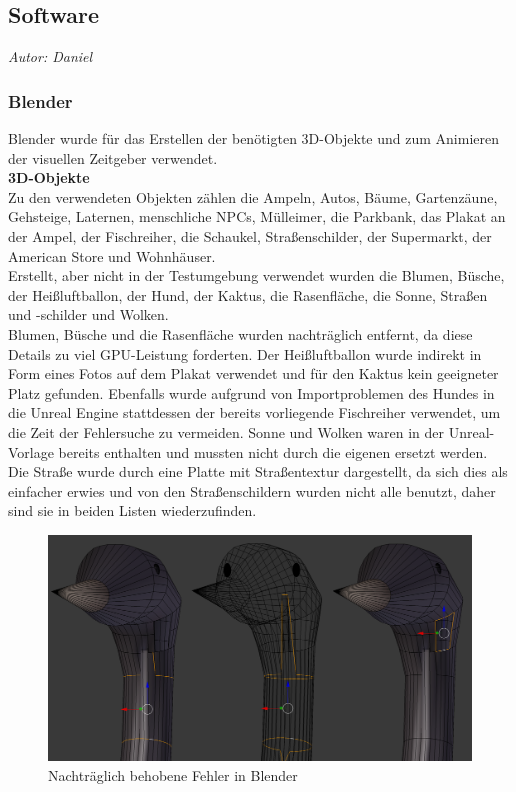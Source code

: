 \documentclass{Bericht}
\begin{document}
\subsection{Software}
\textit{Autor: Daniel}\\
\subsubsection{Blender}
Blender wurde für das Erstellen der benötigten 3D-Objekte und zum Animieren der visuellen Zeitgeber verwendet.\\

\textbf{3D-Objekte}\\
Zu den verwendeten Objekten zählen die Ampeln, Autos, Bäume, Gartenzäune, Gehsteige, Laternen, menschliche NPCs, Mülleimer, die Parkbank, das Plakat an der Ampel, der Fischreiher, die Schaukel, Straßenschilder, der Supermarkt, der American Store und Wohnhäuser.\\
Erstellt, aber nicht in der Testumgebung verwendet wurden die Blumen, Büsche, der Heißluftballon, der Hund, der Kaktus, die Rasenfläche, die Sonne, Straßen und -schilder und Wolken.\\
		Blumen, Büsche und die Rasenfläche wurden nachträglich entfernt, da diese Details zu viel GPU-Leistung forderten. Der Heißluftballon wurde indirekt in Form eines Fotos auf dem Plakat verwendet und für den Kaktus kein geeigneter Platz gefunden. Ebenfalls wurde aufgrund von Importproblemen des Hundes in die Unreal Engine stattdessen der bereits vorliegende Fischreiher verwendet, um die Zeit der Fehlersuche zu vermeiden.
 		Sonne und Wolken waren in der Unreal-Vorlage bereits enthalten und mussten nicht durch die eigenen ersetzt werden. 
		Die Straße wurde durch eine Platte mit Straßentextur dargestellt, da sich dies als einfacher erwies und von den Straßenschildern wurden nicht alle benutzt, daher sind sie in beiden Listen wiederzufinden.\\

		\begin{figure}[H] %
			\centering
			\includegraphics[height=\textheight, width=\linewidth, keepaspectratio, angle=0]{../Bilder/Heron_Problem.png} %
			\caption{Nachträglich behobene Fehler in Blender}
			\label{img:heron-error}
		\end{figure}
\end{document}
